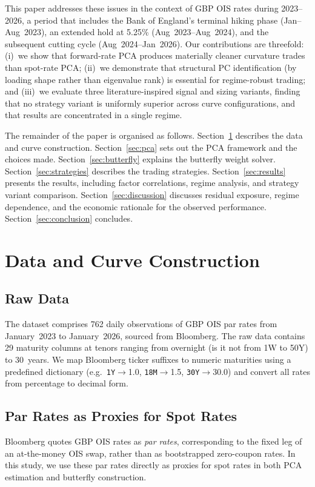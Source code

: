 \documentclass[11pt,a4paper]{article}
\begin{document}
This paper addresses these issues in the context of GBP OIS rates during
2023--2026, a period that includes the Bank of England's terminal hiking
phase (Jan--Aug~2023), an extended hold at 5.25\% (Aug~2023--Aug~2024),
and the subsequent cutting cycle (Aug~2024--Jan~2026).  Our
contributions are threefold: (i)~we show that forward-rate PCA produces
materially cleaner curvature trades than spot-rate PCA; (ii)~we
demonstrate that structural PC identification (by loading shape rather
than eigenvalue rank) is essential for regime-robust trading; and
(iii)~we evaluate three literature-inspired signal and sizing variants,
finding that no strategy variant is uniformly superior across curve
configurations, and that results are concentrated in a single regime.

The remainder of the paper is organised as follows.
Section~\ref{sec:data} describes the data and curve construction.
Section~\ref{sec:pca} sets out the PCA framework and the choices made.
Section~\ref{sec:butterfly} explains the butterfly weight solver.
Section~\ref{sec:strategies} describes the trading strategies.
Section~\ref{sec:results} presents the results, including factor
correlations, regime analysis, and strategy variant comparison.
Section~\ref{sec:discussion} discusses residual exposure, regime
dependence, and the economic rationale for the observed performance.
Section~\ref{sec:conclusion} concludes.


\section{Data and Curve Construction}
\label{sec:data}

\subsection{Raw Data}
The dataset comprises 762 daily observations of GBP OIS par rates
from January~2023 to January~2026, sourced from Bloomberg. The raw
data contains 29 maturity columns at tenors ranging from overnight (is it not from 1W to 50Y) 
to 30~years. We map Bloomberg ticker suffixes to numeric maturities
using a predefined dictionary (e.g.\ \texttt{1Y}$\to$1.0,
\texttt{18M}$\to$1.5, \texttt{30Y}$\to$30.0) and convert all rates
from percentage to decimal form.

\subsection{Par Rates as Proxies for Spot Rates}
\label{sec:par_vs_zero}
Bloomberg quotes GBP OIS rates as \emph{par rates}, corresponding to
the fixed leg of an at-the-money OIS swap, rather than as bootstrapped
zero-coupon rates.  In this study, we use these par rates directly as
proxies for spot rates in both PCA estimation and butterfly construction.
\end{document}
